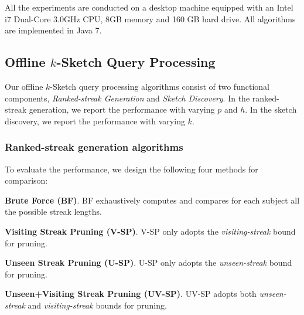 All the experiments are conducted on a desktop machine equipped with an Intel i7 Dual-Core 3.0GHz CPU, 8GB memory and 160 GB hard drive. All algorithms are implemented in Java 7. 
 
\subsection{Offline $k$-Sketch Query Processing}
\label{subsec:exp-offline}
Our offline $k$-Sketch query processing algorithms consist of two functional components, \emph{Ranked-streak Generation}
and \emph{Sketch Discovery}. In the ranked-streak generation, we report the performance with varying $p$ and $h$. In the sketch discovery, we report the performance with varying $k$.

\subsubsection{Ranked-streak generation algorithms}
To evaluate the performance, we design the following four methods for comparison:

\noindent\textbf{Brute Force (BF)}. BF exhaustively computes and compares for each subject all the possible streak lengths. 

\noindent\textbf{Visiting Streak Pruning (V-SP)}. V-SP only adopts the \emph{visiting-streak} bound for pruning.

\noindent\textbf{Unseen Streak Pruning (U-SP)}. U-SP only adopts the \emph{unseen-streak} bound for pruning. 

\noindent\textbf{Unseen+Visiting Streak Pruning (UV-SP)}. UV-SP adopts both \emph{unseen-streak} and \emph{visiting-streak} bounds for pruning.

